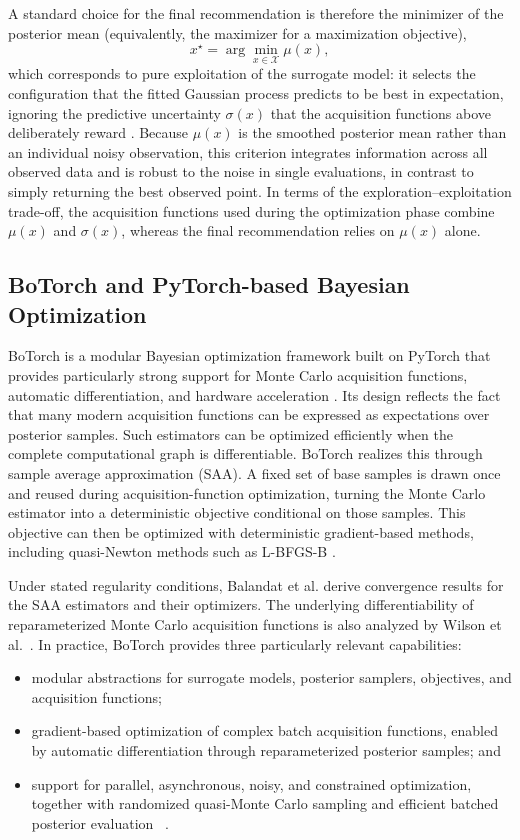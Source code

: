 A standard choice for the final recommendation is therefore the minimizer of the posterior mean (equivalently, the maximizer for a maximization objective),
\[
x^{\star}
=
\arg\min_{x\in\mathcal{X}}
\mu(x),
\]
which corresponds to pure exploitation of the surrogate model: it selects the configuration that the fitted Gaussian process predicts to be best in expectation, ignoring the predictive uncertainty $\sigma(x)$ that the acquisition functions above deliberately reward \cite{shahriari2015taking,di2024active}. Because $\mu(x)$ is the smoothed posterior mean rather than an individual noisy observation, this criterion integrates information across all observed data and is robust to the noise in single evaluations, in contrast to simply returning the best observed point. In terms of the exploration--exploitation trade-off, the acquisition functions used during the optimization phase combine $\mu(x)$ and $\sigma(x)$, whereas the final recommendation relies on $\mu(x)$ alone.

\subsection{BoTorch and PyTorch-based Bayesian Optimization}
BoTorch is a modular Bayesian optimization framework built on PyTorch that provides particularly strong support for Monte Carlo acquisition functions, automatic differentiation, and hardware acceleration \cite{balandat2020botorch}. Its design reflects the fact that many modern acquisition functions can be expressed as expectations over posterior samples. Such estimators can be optimized efficiently when the complete computational graph is differentiable. BoTorch realizes this through sample average approximation (SAA). A fixed set of base samples is drawn once and reused during acquisition-function optimization, turning the Monte Carlo estimator into a deterministic objective conditional on those samples. This objective can then be optimized with deterministic gradient-based methods, including quasi-Newton methods such as L-BFGS-B \cite{balandat2019botorch}.

Under stated regularity conditions, Balandat et al. \cite{balandat2019botorch} derive convergence results for the SAA estimators and their optimizers. The underlying differentiability of reparameterized Monte Carlo acquisition functions is also analyzed by Wilson et al.~\cite{wilson2018maximizing}. In practice, BoTorch provides three particularly relevant capabilities:
\begin{itemize}
\item modular abstractions for surrogate models, posterior samplers, objectives,
and acquisition functions;
\item gradient-based optimization of complex batch acquisition functions,
enabled by automatic differentiation through reparameterized posterior
samples; and
\item support for parallel, asynchronous, noisy, and constrained optimization,
together with randomized quasi-Monte Carlo sampling and efficient batched
posterior evaluation
~\cite{balandat2019botorch,wilson2018maximizing}.
\end{itemize}
